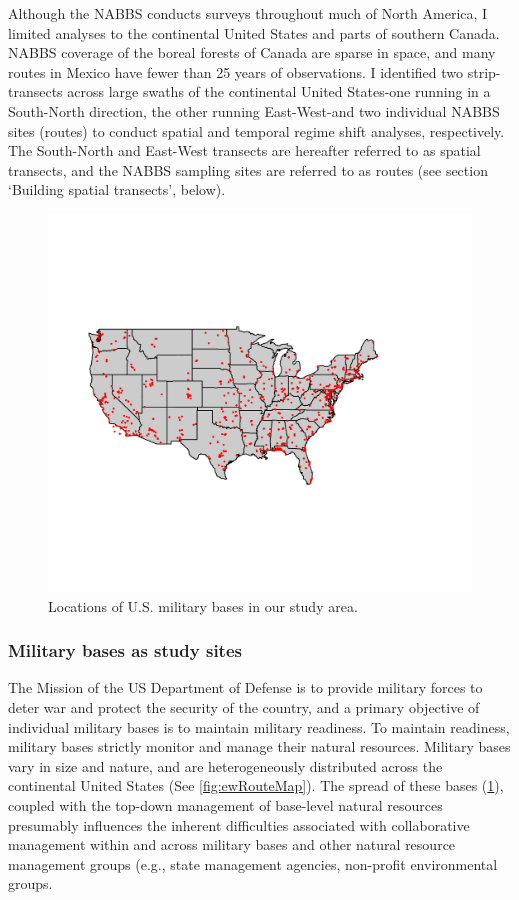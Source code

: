 \documentclass[12pt,twoside,openany]{reedthesis}
\begin{document}
Although the NABBS conducts surveys throughout much of North America, I
limited analyses to the continental United States and parts of southern
Canada. NABBS coverage of the boreal forests of Canada are sparse in
space, and many routes in Mexico have fewer than 25 years of
observations. I identified two strip-transects across large swaths of
the continental United States-one running in a South-North direction,
the other running East-West-and two individual NABBS sites (routes) to
conduct spatial and temporal regime shift analyses, respectively. The
South-North and East-West transects are hereafter referred to as spatial
transects, and the NABBS sampling sites are referred to as routes (see
section `Building spatial transects', below).
\begin{figure}

{\centering \includegraphics[width=0.85\linewidth]{./chapterFiles/fisherSpatial/figures/figsCalledInDiss/milBases} 

}

\caption{Locations of U.S. military bases in our study area.}\label{fig:milBases}
\end{figure}
\subsubsection{Military bases as study
sites}\label{military-bases-as-study-sites}

The Mission of the US Department of Defense is to provide military
forces to deter war and protect the security of the country, and a
primary objective of individual military bases is to maintain military
readiness. To maintain readiness, military bases strictly monitor and
manage their natural resources. Military bases vary in size and nature,
and are heterogeneously distributed across the continental United States
(See \ref{fig:ewRouteMap}). The spread of these bases
(\ref{fig:milBases}), coupled with the top-down management of base-level
natural resources presumably influences the inherent difficulties
associated with collaborative management within and across military
bases and other natural resource management groups (e.g., state
management agencies, non-profit environmental groups.
\end{document}
